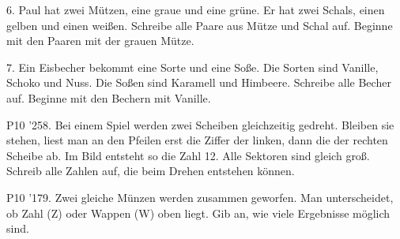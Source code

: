 \documentclass[11pt]{article}
\begin{document}
\pfgruppe{}
\begin{pfaufg}{}{6.}{}
Paul hat zwei Mützen, eine graue und eine grüne. Er hat zwei Schals, einen gelben und einen weißen. Schreibe alle Paare aus Mütze und Schal auf. Beginne mit den Paaren mit der grauen Mütze.
\end{pfaufg}
\begin{pfaufg}{}{7.}{}
Ein Eisbecher bekommt eine Sorte und eine Soße. Die Sorten sind Vanille, Schoko und Nuss. Die Soßen sind Karamell und Himbeere. Schreibe alle Becher auf. Beginne mit den Bechern mit Vanille.
\end{pfaufg}
\pfgruppe{}
\begin{pfaufg}{P10 ’25}{8.}{}
Bei einem Spiel werden zwei Scheiben gleichzeitig gedreht. Bleiben sie stehen, liest man an den Pfeilen erst die Ziffer der linken, dann die der rechten Scheibe ab. Im Bild entsteht so die Zahl 12. Alle Sektoren sind gleich groß. Schreib alle Zahlen auf, die beim Drehen entstehen können.
\par\smallskip\noindent {}\hspace{1.2cm}\par
{}
\end{pfaufg}
\pfgruppe{}
\begin{pfaufg}{P10 ’17}{9.}{}
Zwei gleiche Münzen werden zusammen geworfen. Man unterscheidet, ob Zahl (Z) oder Wappen (W) oben liegt. Gib an, wie viele Ergebnisse möglich sind.
\end{pfaufg}
\end{document}
